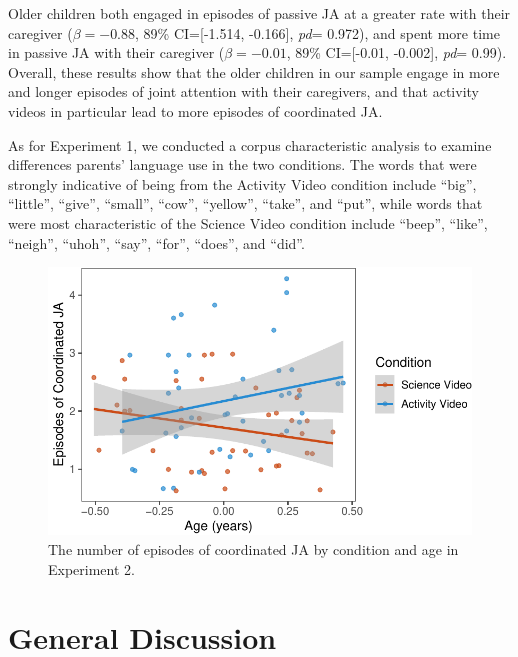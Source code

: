 \documentclass[man,floatsintext]{apa6}
\begin{document}
Older children both engaged in episodes of passive JA at a greater rate with their caregiver (\(\beta=-0.88\), 89\% CI={[}-1.514, -0.166{]}, \emph{pd}= 0.972), and spent more time in passive JA with their caregiver (\(\beta=-0.01\), 89\% CI={[}-0.01, -0.002{]}, \emph{pd}= 0.99).
Overall, these results show that the older children in our sample engage in more and longer episodes of joint attention with their caregivers, and that activity videos in particular lead to more episodes of coordinated JA.

As for Experiment 1, we conducted a corpus characteristic analysis to examine differences parents' language use in the two conditions.
The words that were strongly indicative of being from the Activity Video condition include \enquote{big}, \enquote{little}, \enquote{give}, \enquote{small}, \enquote{cow}, \enquote{yellow}, \enquote{take}, and \enquote{put}, while words that were most characteristic of the Science Video condition include \enquote{beep}, \enquote{like}, \enquote{neigh}, \enquote{uhoh}, \enquote{say}, \enquote{for}, \enquote{does}, and \enquote{did}.

\begin{figure}[H]

{\centering \includegraphics{figs/e2ja-coord-1} 

}

\caption{The number of episodes of coordinated JA by condition and age in Experiment 2.}\label{fig:e2ja-coord}
\end{figure}

\hypertarget{general-discussion}{%
\section{General Discussion}\label{general-discussion}}
\end{document}

